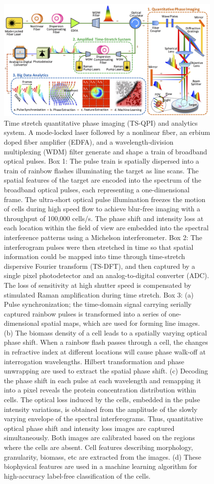 \documentclass[aps,pra,reprint,superscriptaddress]{revtex4-1}
\begin{document}
\begin{figure}
\includegraphics[scale=0.2]{FigureSetup.jpg}
\caption{\label{fig:Setup} Time stretch quantitative phase imaging (TS-QPI) and analytics system. A mode-locked laser followed by a nonlinear fiber, an erbium doped fiber amplifier (EDFA), and a wavelength-division multiplexing (WDM) filter generate and shape a train of broadband optical pulses. Box 1: The pulse train is spatially dispersed into a train of rainbow flashes illuminating the target as line scans. The spatial features of the target are encoded into the spectrum of the broadband optical pulses, each representing a one-dimensional frame. The ultra-short optical pulse illumination freezes the motion of cells during high speed flow to achieve blur-free imaging with a throughput of 100,000 cells/s. The phase shift and intensity loss at each location within the field of view are embedded into the spectral interference patterns using a Michelson interferometer. Box 2: The interferogram pulses were then stretched in time so that spatial information could be mapped into time through time-stretch dispersive Fourier transform (TS-DFT), and then captured by a single pixel photodetector and an analog-to-digital converter (ADC). The loss of sensitivity at high shutter speed is compensated by stimulated Raman amplification during time stretch. Box 3: (a) Pulse synchronization; the time-domain signal carrying serially captured rainbow pulses is transformed into a series of one-dimensional spatial maps, which are used for forming line images. (b) The biomass density of a cell leads to a spatially varying optical phase shift. When a rainbow flash passes through a cell, the changes in refractive index at different locations will cause phase walk-off at interrogation wavelengths. Hilbert transformation and phase unwrapping are used to extract the spatial phase shift. (c) Decoding the phase shift in each pulse at each wavelength and remapping it into a pixel reveals the protein concentration distribution within cells. The optical loss induced by the cells, embedded in the pulse intensity variations, is obtained from the amplitude of the slowly varying envelope of the spectral interferograms. Thus, quantitative optical phase shift and intensity loss images are captured simultaneously. Both images are calibrated based on the regions where the cells are absent. Cell features describing morphology, granularity, biomass, etc are extracted from the images. (d) These biophysical features are used in a machine learning algorithm for high-accuracy label-free classification of the cells.}

\end{figure}
\end{document}
